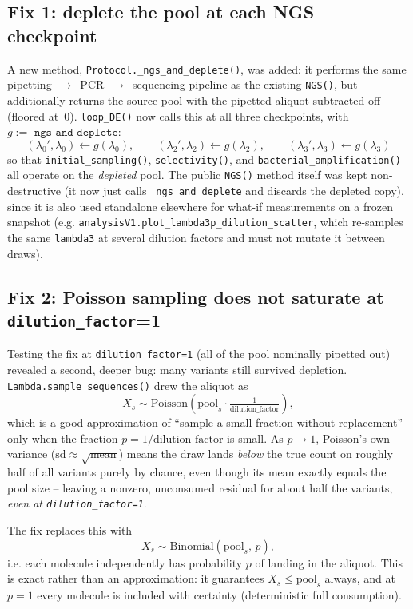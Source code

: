 \documentclass[11pt]{article}
\newcommand{\code}[1]{\texttt{#1}}
\begin{document}
\subsection{Fix 1: deplete the pool at each NGS checkpoint}

A new method, \code{Protocol.\_ngs\_and\_deplete()}, was added: it performs the same
pipetting~$\to$~PCR~$\to$~sequencing pipeline as the existing \code{NGS()}, but additionally
returns the source pool with the pipetted aliquot subtracted off (floored at~0). \code{loop\_DE()}
now calls this at all three checkpoints, with $g := \code{\_ngs\_and\_deplete}$:
\[
  (\lambda_0', \lambda_0) \leftarrow g(\lambda_0), \qquad
  (\lambda_2', \lambda_2) \leftarrow g(\lambda_2), \qquad
  (\lambda_3', \lambda_3) \leftarrow g(\lambda_3)
\]
so that \code{initial\_sampling()}, \code{selectivity()}, and \code{bacterial\_amplification()}
all operate on the \emph{depleted} pool. The public \code{NGS()} method itself was kept
non-destructive (it now just calls \code{\_ngs\_and\_deplete} and discards the depleted copy),
since it is also used standalone elsewhere for what-if measurements on a frozen snapshot (e.g.
\code{analysisV1.plot\_lambda3p\_dilution\_scatter}, which re-samples the same \code{lambda3} at
several dilution factors and must not mutate it between draws).

\subsection{Fix 2: Poisson sampling does not saturate at \code{dilution\_factor}=1}

Testing the fix at \code{dilution\_factor=1} (all of the pool nominally pipetted out) revealed a
second, deeper bug: many variants still survived depletion. \code{Lambda.sample\_sequences()} drew
the aliquot as
\[
  X_s \sim \mathrm{Poisson}\!\left(\mathrm{pool}_s \cdot \tfrac{1}{\text{dilution\_factor}}\right),
\]
which is a good approximation of ``sample a small fraction without replacement'' only when the
fraction $p = 1/\text{dilution\_factor}$ is small. As $p \to 1$, Poisson's own variance
($\mathrm{sd} \approx \sqrt{\text{mean}}$) means the draw lands \emph{below} the true count on
roughly half of all variants purely by chance, even though its mean exactly equals the pool size --
leaving a nonzero, unconsumed residual for about half the variants, \emph{even at
\code{dilution\_factor=1}}.

The fix replaces this with
\[
  X_s \sim \mathrm{Binomial}(\mathrm{pool}_s,\, p),
\]
i.e. each molecule independently has probability $p$ of landing in the aliquot. This is exact
rather than an approximation: it guarantees $X_s \le \mathrm{pool}_s$ always, and at $p=1$ every
molecule is included with certainty (deterministic full consumption).
\end{document}
